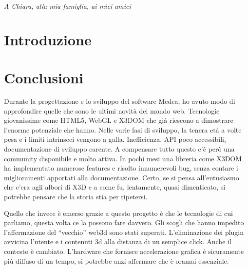 \documentclass[a4paper,12pt]{report}
\def\dedica{A Chiara, alla mia famiglia, ai miei amici}
\newlength\corpo
\begin{document}
\newpage
\vspace*{2.5cm}
\begin{flushright}
\begin{Large}\emph{\dedica}\end{Large}
\end{flushright}
\frenchspacing
%

\tableofcontents
\listoffigures
{}
\chapter*{Introduzione}
\pagestyle{fancy}
\fancyfoot[RO]{\thepage \hfil}



\chapter*{Conclusioni}
Durante la progettazione e lo sviluppo del software Medea, ho avuto modo di approfondire quelle che sono le ultimi novità del mondo web. Tecnologie giovanissime come HTML5, WebGL e X3DOM che già riescono a dimostrare l'enorme potenziale che hanno. Nelle varie fasi di sviluppo, la tenera età a volte pesa e i limiti intrinseci vengono a galla. Inefficienza, API poco accessibili, documentazione di sviluppo carente. A compensare tutto questo c'è però una community disponibile e molto attiva. In pochi mesi una libreria come X3DOM ha implementato numerose features e risolto innumerevoli bug, senza contare i miglioramenti apportati alla documentazione. Certo, se si pensa all'entusiasmo che c'era agli albori di X3D e a come fu, lentamente, quasi dimenticato, si potrebbe pensare che la storia stia per ripetersi.

Quello che invece è emerso grazie a questo progetto è che le tecnologie di cui parliamo, questa volta ce la possono fare davvero. Gli scogli che hanno impedito l'affermazione del ``vecchio'' web3d sono stati superati. L'eliminazione dei plugin avvicina l'utente e i contenuti 3d alla distanza di un semplice click. Anche il contesto è cambiato. L'hardware che fornisce accelerazione grafica è sicuramente più diffuso di un tempo, si potrebbe anzi affermare che è oramai essenziale.
\end{document}
